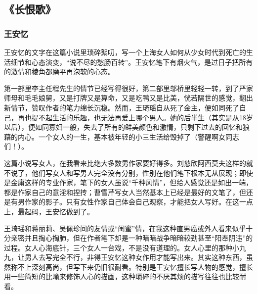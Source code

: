 \subsection{《长恨歌》}

\subsubsection{王安忆}

王安忆的文字在这篇小说里琐碎絮叨，写一个上海女人如何从少女时代到死亡的生活细节和心态演变，“说不尽的愁肠百转”。王安忆笔下有烟火气，是过日子把所有的激情和棱角都磨平再泡软的心态。

第一部里李主任程先生的情节已经写得很好，第二部里邬桥里轻轻一转，到了严家师母和毛毛娘舅，又是打牌又是算命，又是吃鸭又是比美，恍若隔世的感觉，翻出新情节，赞叹作者的笔力绵长沉稳。然而，王琦瑶自从死了金主，便如同死了自己，再也提不起生活的乐趣，也无法再爱上哪个男人。她的后半生（其实是从18岁以后），便如同寡妇一般，失去了所有的鲜美颜色和激情，只剩下过去的回忆和狼藉的内心。一个女人的一生，基本被年轻的小三生活给毁掉了（警醒啊女同志们！）。

这篇小说写女人，在我看来比绝大多数男作家要好得多。刘慈欣阿西莫夫这样的就不说了，他们写女人和写男人完全没有分别，性别在他们笔下根本无从展现；即使是金庸这样的专业作家，笔下的女人虽说“千种风情”，但给人感觉还是如出一端，都是作家自己的意淫和捏抟；曹雪芹写女人当然基本上已经是最好的文笔了，但还是有男作家的影子。只有女性作家自己体会自己观察，才能把女人写好。在这一点上，最起码，王安忆做到了。

王琦瑶和蒋丽莉、吴佩珍间的友情或“闺蜜”情，在我这种直男癌或外人看来似乎十分亲密并且掏心掏肺，但在作者笔下却是一种暗暗战争暗暗较劲甚至“阳奉阴违”的过程。女人心海底针，三个女人一台戏，不是没有道理的。女人心里的那种小九九，让男人去写完全不行，非得王安忆这种女作用才能写出来。其实这种东西，虽然称不上深刻高尚，但写下来仍旧很耐看。特别是王安忆擅长写人物的感觉，擅长用一些简短的比喻来修饰人心的描画，这种琐碎的不厌其烦的描写往往也比较耐看。

